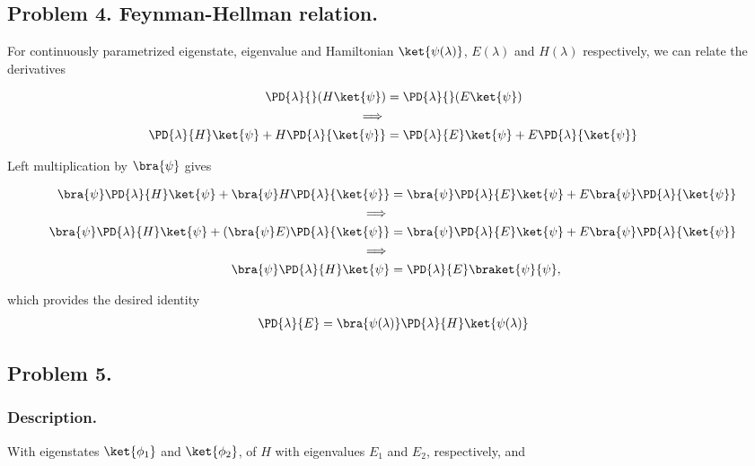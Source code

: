 \subsection{Problem 4. Feynman-Hellman relation.}

For continuously parametrized eigenstate, eigenvalue and Hamiltonian $\ket{\psi(\lambda)}$, $E(\lambda)$ and $H(\lambda)$ respectively, we can relate the derivatives

\begin{align*}
\PD{\lambda}{} ( H \ket{\psi} ) &= \PD{\lambda}{} ( E \ket{\psi} ) \\
\implies \\
\PD{\lambda}{H} \ket{\psi} +H \PD{\lambda}{\ket{\psi}} &= \PD{\lambda}{E} \ket{\psi} + E \PD{\lambda}{\ket{\psi} } 
\end{align*}

Left multiplication by $\bra{\psi}$ gives

\begin{align*}
\bra{\psi}\PD{\lambda}{H} \ket{\psi} +\bra{\psi}H \PD{\lambda}{\ket{\psi}} &= \bra{\psi}\PD{\lambda}{E} \ket{\psi} +  E \bra{\psi}\PD{\lambda}{\ket{\psi} } \\
\implies \\
\bra{\psi}\PD{\lambda}{H} \ket{\psi} +(\bra{\psi}E) \PD{\lambda}{\ket{\psi}} &= \bra{\psi}\PD{\lambda}{E} \ket{\psi} +  E \bra{\psi}\PD{\lambda}{\ket{\psi} } \\
\implies \\
\bra{\psi}\PD{\lambda}{H} \ket{\psi} &= \PD{\lambda}{E} \braket{\psi}{\psi},
\end{align*}

which provides the desired identity
\begin{align}\label{eqn:desaiCh3:4}
\PD{\lambda}{E} 
= \bra{\psi(\lambda)}\PD{\lambda}{H} \ket{\psi(\lambda)}
\end{align}

\subsection{Problem 5. }
\subsubsection{Description. }

With eigenstates $\ket{\phi_1}$ and $\ket{\phi_2}$, of $H$ with eigenvalues $E_1$ and $E_2$, respectively, and

